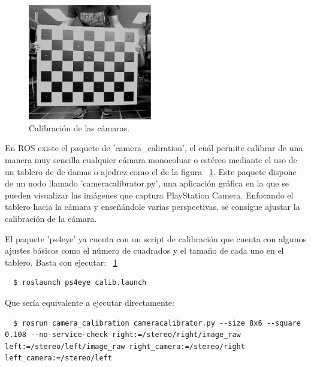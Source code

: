 \begin{figure}
  \vspace{-20pt}
  \begin{center}
    \includegraphics[width=0.48\textwidth]{images/cap4/Calibracion.eps}
  \end{center}
  \vspace{-20pt}
  \caption{Calibración de las cámaras.}
  \vspace{-10pt}
  \label{fig:Calibracion}
\end{figure}

En ROS existe el paquete de 'camera\_caliration', el cuál permite calibrar de
una manera muy sencilla cualquier cámara monocoluar o estéreo mediante el uso de
un tablero de de damas o ajedrez como el de la figura ~\ref{fig:Calibracion}.
Este paquete dispone de un nodo llamado 'cameracalibrator.py', una aplicación
gráfica en la que se pueden visualizar las imágenes que captura PlayStation
Camera. Enfocando el tablero hacia la cámara y enseñándole varias perspectivas,
se consigue ajustar la calibración de la cámara.

El paquete 'ps4eye' ya cuenta con un script de calibración que cuenta con
algunos ajustes básicos como el número de cuadrados y el tamaño de cada uno en
el tablero. Basta con ejecutar:
~\ref{fig:Calibracion} 
\\
\begin{lstlisting}
  $ roslaunch ps4eye calib.launch 
\end{lstlisting}

Que sería equivalente a ejecutar directamente:

\begin{lstlisting}
  $ rosrun camera_calibration cameracalibrator.py --size 8x6 --square 0.108 --no-service-check right:=/stereo/right/image_raw left:=/stereo/left/image_raw right_camera:=/stereo/right left_camera:=/stereo/left
\end{lstlisting}


